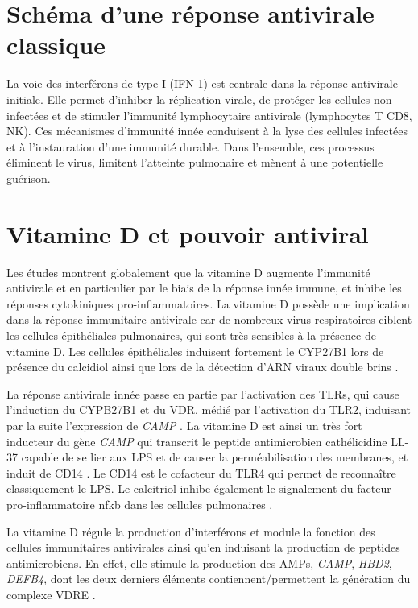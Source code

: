 \documentclass[
  a4paper,
  DIV=11,
  numbers=noendperiod,
  listof=totoc]{scrreprt}
\begin{document}
\section{Schéma d'une réponse antivirale
classique}\label{schuxe9ma-dune-ruxe9ponse-antivirale-classique}

La voie des interférons de type I (IFN-1) est centrale dans la réponse
antivirale initiale. Elle permet d'inhiber la réplication virale, de
protéger les cellules non-infectées et de stimuler l'immunité
lymphocytaire antivirale (lymphocytes T CD8, NK). Ces mécanismes
d'immunité innée conduisent à la lyse des cellules infectées et à
l'instauration d'une immunité durable. Dans l'ensemble, ces processus
éliminent le virus, limitent l'atteinte pulmonaire et mènent à une
potentielle guérison.

\section{Vitamine D et pouvoir
antiviral}\label{vitamine-d-et-pouvoir-antiviral}

\textcite{Bishop.2021}

Les études montrent globalement que la vitamine D augmente l'immunité
antivirale et en particulier par le biais de la réponse innée immune, et
inhibe les réponses cytokiniques pro-inflammatoires. La vitamine D
possède une implication dans la réponse immunitaire antivirale car de
nombreux virus respiratoires ciblent les cellules épithéliales
pulmonaires, qui sont très sensibles à la présence de vitamine D. Les
cellules épithéliales induisent fortement le \ac{CYP27B1} lors de
présence du calcidiol ainsi que lors de la détection d'ARN viraux double
brins \autocite{Bishop.2021}.

La réponse antivirale innée passe en partie par l'activation des
\acp{TLR}, qui cause l'induction du \ac{CYPB27B1} et du \ac{VDR}, médié
par l'activation du TLR2, induisant par la suite l'expression de
\emph{CAMP} \autocite{Liu.2006}. La vitamine D est ainsi un très fort
inducteur du gène \emph{CAMP} qui transcrit le peptide antimicrobien
cathélicidine LL-37 capable de se lier aux \ac{LPS} et de causer la
perméabilisation des membranes, et induit de CD14
\autocite{Hewison.2007}. Le CD14 est le cofacteur du TLR4 qui permet de
reconnaître classiquement le \ac{LPS.} Le calcitriol inhibe également le
signalement du facteur pro-inflammatoire \ac{nfkb} dans les cellules
pulmonaires \autocite{Bishop.2021}.

La vitamine D régule la production d'interférons et module la fonction
des cellules immunitaires antivirales ainsi qu'en induisant la
production de peptides antimicrobiens. En effet, elle stimule la
production des AMPs, \emph{CAMP}, \emph{HBD2}, \emph{DEFB4}, dont les
deux derniers éléments contiennent/permettent la génération du complexe
\ac{VDRE} \autocite{Bishop.2021}.
\end{document}
